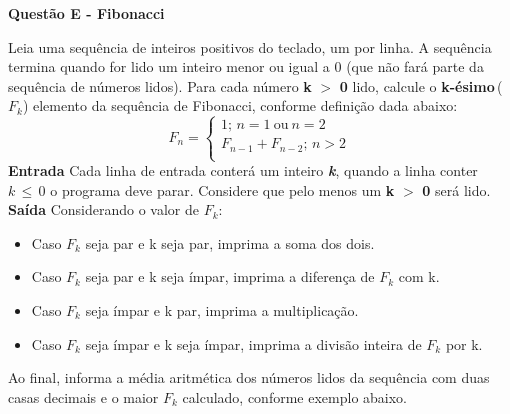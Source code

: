 \documentclass[a4paper, 12pt]{article}
\begin{document}
\newpage %
\begin{center}
\textbf{{\Large Questão E - Fibonacci}}
\end{center}
\vspace{5pt}
Leia uma sequência de inteiros positivos do teclado, um por linha. A sequência termina quando for lido um inteiro menor ou igual a 0 (que não fará parte da sequência de números lidos). Para cada número 
\textbf{k} $>$ \textbf{0} lido, calcule o \textbf{k-ésimo}\,($F_k$) elemento da sequência de Fibonacci, conforme definição dada abaixo:
$$F_n =
		\begin{cases}
			1;\, n = 1\ \textrm{ou}\ n = 2 \\
			F_{n-1} + F_{n-2};\, n > 2 \\
		\end{cases}
$$
\newline \newline
\textbf{{\large Entrada}} \newline
Cada linha de entrada conterá um inteiro \textbf{\textit{k}}, quando a linha conter 
$k\, \leq \, 0$ o programa deve parar. Considere que pelo menos um \textbf{k} $>$ \textbf{0} será lido.
\newline \newline
\textbf{{\large Saída}} \newline
Considerando o valor de $F_k$:
\begin{itemize}
\item Caso $F_k$ seja par e k seja par, imprima a soma dos dois.
\item Caso $F_k$ seja par e k seja ímpar, imprima a diferença de $F_k$ com k.
\item Caso $F_k$ seja ímpar e k par, imprima a multiplicação.
\item Caso $F_k$ seja ímpar e k seja ímpar, imprima a divisão inteira de $F_k$ por k.
\end{itemize}
Ao final, informa a média aritmética dos números lidos da sequência com duas casas decimais e o maior $F_k$ calculado, conforme exemplo abaixo.
\newline
\end{document}
